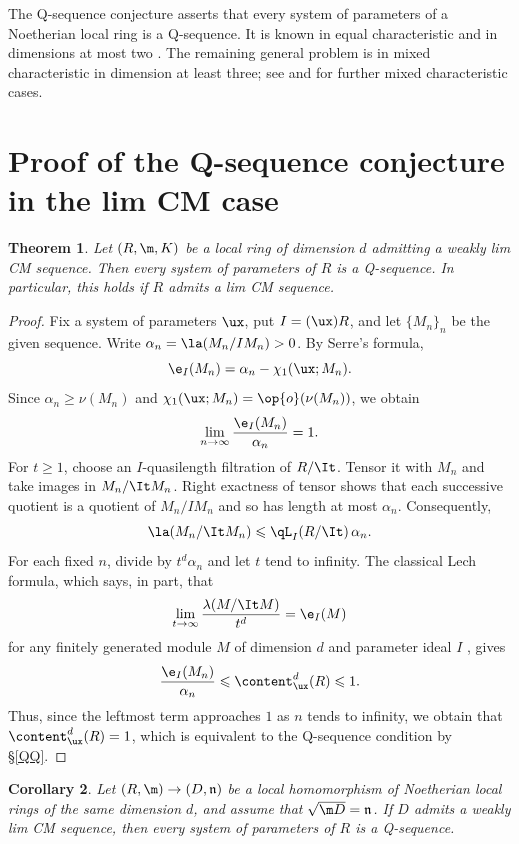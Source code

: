\documentclass[12pt]{amsart}
\theoremstyle{plain}
\newtheorem{theorem}{Theorem}[section]
\newtheorem{corollary}[theorem]{Corollary}
\theoremstyle{remark}
\theoremstyle{definition}
\numberwithin{equation}{theorem}
\renewcommand{\geq}{\geqslant} \renewcommand{\leq}{\leqslant}
\begin{document}
The Q-sequence conjecture asserts that every system of parameters
of a Noetherian local ring is a Q-sequence. It is known in equal
characteristic and in dimensions at most two
\cite[Theorems~4.1, 4.6, and 4.7]{HoHu09}. The remaining general
problem is in mixed characteristic in dimension at least three;
see \cite[Conjecture~8.1]{HoZh18} and \cite{Str25} for further
mixed characteristic cases.

\section{Proof of the Q-sequence conjecture
in the lim CM case}\label{proof limCM}\label{limCM}

\begin{theorem}\label{weaklimQ}
Let $(R,\m,K)$ be a local ring of dimension $d$ admitting a weakly
lim CM sequence. Then every system of parameters of $R$ is a
Q-sequence. In particular, this holds if $R$ admits a lim CM sequence.
\end{theorem}

\begin{proof}
Fix a system of parameters $\ux$, put $I=(\ux)R$, and let
$\{M_n\}_n$ be the given sequence. Write
$\alpha_n=\la(M_n/IM_n)>0$. By Serre's formula,
\[
 \e_I(M_n)=\alpha_n-\chi_1(\ux;M_n).
\]
Since $\alpha_n\geq\nu(M_n)$ and
$\chi_1(\ux;M_n)=\op{o}(\nu(M_n))$, we obtain
\[
                 \lim_{n\to\infty}\frac{\e_I(M_n)}{\alpha_n}=1.
\]
For $t\geq1$, choose an $I$-quasilength filtration of $R/\It$.
Tensor it with $M_n$ and take images in $M_n/\It M_n$.
Right exactness of tensor shows that each successive quotient is a quotient
of $M_n/IM_n$ and so has length at most $\alpha_n$. Consequently,
\[
 \la(M_n/\It M_n)\leq\qL_I(R/\It)\,\alpha_n.
\]
For each fixed $n$, divide by $t^d \alpha_n$ and let $t$ tend to infinity.
The classical Lech formula, which says, in part, that 
\[\lim_{t\to \infty} \frac{\lambda(M/\It M)}{t^d} = \e_I(M)\] 
for any finitely generated module $M$ of dimension $d$ and parameter ideal $I$
\cite[Theorem~11.2.10]{SwHu06}, gives
\[ \frac{\e_I(M_n)}{\alpha_n}\leq\content^d_{\ux}(R)\leq1.\]
Thus, since the leftmost term approaches $1$ as $n$ tends to infinity, 
we obtain that $\content^d_{\ux}(R)=1$,
which is equivalent to the Q-sequence condition by \S\ref{QQ}.
\end{proof}

\begin{corollary}\label{transferQ}
Let $(R,\m)\to(D,\mathfrak n)$ be a local homomorphism of
Noetherian local rings of the same dimension $d$, and assume that
$\sqrt{\m D}=\mathfrak n$. If $D$ admits a weakly lim CM sequence,
then every system of parameters of $R$ is a Q-sequence.
\end{corollary}
\end{document}
